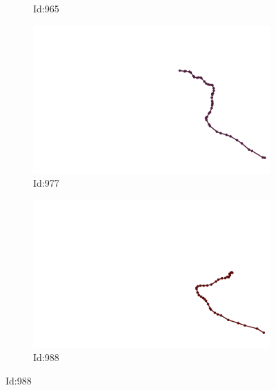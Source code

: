 \documentclass[12pt,twoside]{report}
\begin{document}
\begin{figure}
\begin{subfigure}[b]{0.20\textwidth}
\caption{Id:965}
\end{subfigure}
\begin{subfigure}[b]{0.20\textwidth}
\centering
\includegraphics[width=\textwidth]{../trajectories/977.png}
\caption{Id:977}
\end{subfigure}
\begin{subfigure}[b]{0.20\textwidth}
\centering
\includegraphics[width=\textwidth]{../trajectories/988.png}
\caption{Id:988}
\end{subfigure}
\end{figure}
\end{document}

